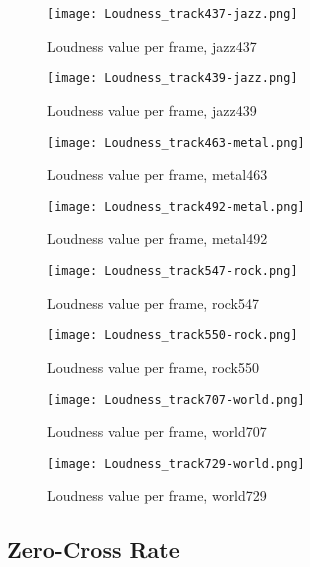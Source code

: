 \documentclass{article} %
\begin{document}
\begin{figure}
\centering
\texttt{[image: Loudness\_track437-jazz.png]}
\caption{Loudness value per frame, jazz437}
\label{fig:loudness_437}
\end{figure}

\begin{figure}
\centering
\texttt{[image: Loudness\_track439-jazz.png]}
\caption{Loudness value per frame, jazz439}
\label{fig:loudness_439}
\end{figure}

\begin{figure}
\centering
\texttt{[image: Loudness\_track463-metal.png]}
\caption{Loudness value per frame, metal463}
\label{fig:loudness_463}
\end{figure}


\begin{figure}
\centering
\texttt{[image: Loudness\_track492-metal.png]}
\caption{Loudness value per frame, metal492}
\label{fig:loudness_492}
\end{figure}


\begin{figure}
\centering
\texttt{[image: Loudness\_track547-rock.png]}
\caption{Loudness value per frame, rock547}
\label{fig:loudness_547}
\end{figure}


\begin{figure}
\centering
\texttt{[image: Loudness\_track550-rock.png]}
\caption{Loudness value per frame, rock550}
\label{fig:loudness_550}
\end{figure}


\begin{figure}
\centering
\texttt{[image: Loudness\_track707-world.png]}
\caption{Loudness value per frame, world707}
\label{fig:loudness_707}
\end{figure}


\begin{figure}[h!]
\centering
\texttt{[image: Loudness\_track729-world.png]}
\caption{Loudness value per frame, world729}
\label{fig:loudness_729}
\end{figure}

\clearpage
\subsection{Zero-Cross Rate}
\label{sec:ZCRFigures}
\end{document}
